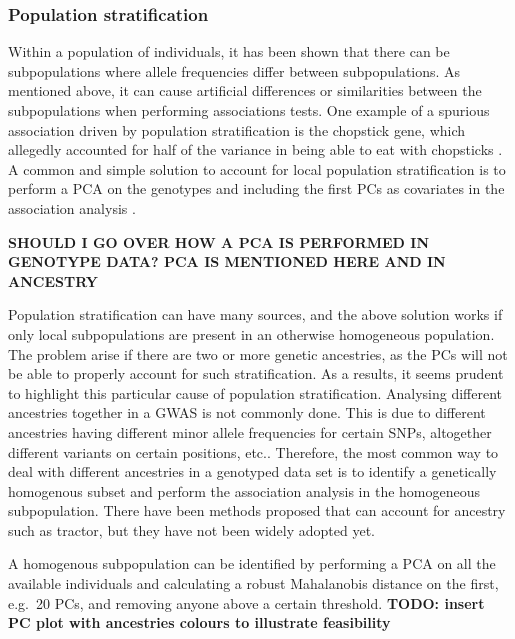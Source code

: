 \subsubsection{Population stratification}
Within a population of individuals, it has been shown that there can be subpopulations where allele frequencies differ between subpopulations\cite{abdellaoui2013association,genome2014whole}. As mentioned above, it can cause artificial differences or similarities between the subpopulations when performing associations tests. One example of a spurious association driven by population stratification is the chopstick gene, which allegedly accounted for half of the variance in being able to eat with chopsticks \cite{marees2018tutorial,hamer2000beware}. A common and simple solution to account for local population stratification is to perform a PCA on the genotypes and including the first PCs as covariates in the association analysis \cite{price2006principal,price2010new,prive2020efficient}.

\textbf{SHOULD I GO OVER HOW A PCA IS PERFORMED IN GENOTYPE DATA? PCA IS MENTIONED HERE AND IN ANCESTRY}

Population stratification can have many sources, and the above solution works if only local subpopulations are present in an otherwise homogeneous population. The problem arise if there are two or more genetic ancestries, as the PCs will not be able to properly account for such stratification. As a results, it seems prudent to highlight this particular cause of population stratification. Analysing different ancestries together in a GWAS is not commonly done. This is due to different ancestries having different minor allele frequencies for certain SNPs, altogether different variants on certain positions, etc.\cite{helgason2005icelandic}. Therefore, the most common way to deal with different ancestries in a genotyped data set is to identify a genetically homogenous subset and perform the association analysis in the homogeneous subpopulation. There have been methods proposed that can account for ancestry such as tractor\cite{atkinson2021tractor}, but they have not been widely adopted yet. 

A homogenous subpopulation can be identified by performing a PCA on all the available individuals and calculating a robust Mahalanobis distance on the first, e.g.\ 20 PCs, and removing anyone above a certain threshold\cite{prive2020efficient}. 
\textbf{TODO: insert PC plot with ancestries colours to illustrate feasibility}

